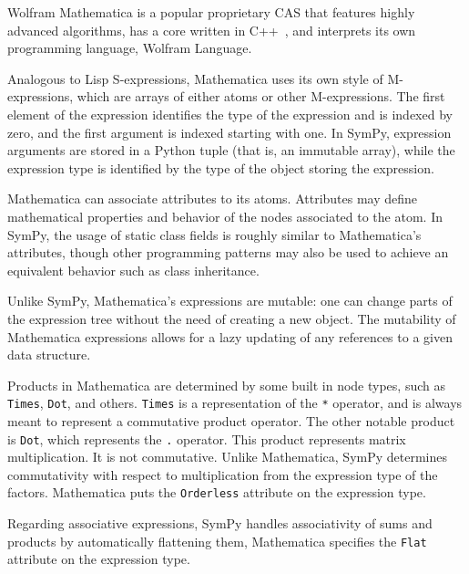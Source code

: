 Wolfram Mathematica is a popular proprietary CAS that
features highly advanced algorithms, has a core written in
C++~\cite{Wolfram2003book}, and interprets its own programming language,
Wolfram Language.


Analogous to Lisp S-expressions,
Mathematica uses its own style of M-expres\-sions,
which are arrays of either atoms or other M-expressions.
The first element of the expression identifies the type of the expression
and is indexed by zero, and the first argument is indexed starting with one.
In SymPy, expression arguments are stored in a Python tuple
(that is, an immutable array),
while the expression type is identified by the type of the object storing the
expression.


Mathematica can associate attributes to its atoms.
Attributes may define mathematical properties and behavior of the nodes
associated to the atom.
In SymPy, the usage of static class fields is roughly similar to Mathematica's
attributes, though other programming patterns may also be used to achieve an
equivalent behavior such as class inheritance.


Unlike SymPy, Mathematica's expressions are mutable:
one can change parts of the expression tree without the need of
creating a new object.
The mutability of Mathematica expressions allows for a lazy updating of any references
to a given data structure.


Products in Mathematica are determined by some built in node types, such as
\texttt{Times}, \texttt{Dot}, and others.  \texttt{Times} is a representation of
the \texttt{*} operator, and is always meant to represent a commutative product
operator.  The other notable product is \texttt{Dot}, which represents the
\texttt{.} operator.  This product represents matrix multiplication. It is not
commutative.  Unlike
Mathematica, SymPy determines commutativity with respect to multiplication from
the expression type of the factors.  Mathematica puts the \texttt{Orderless} attribute
on the expression type.


Regarding associative expressions,
SymPy handles associativity of sums and products by automatically flattening them,
Mathematica specifies the \texttt{Flat} attribute on the expression type.

